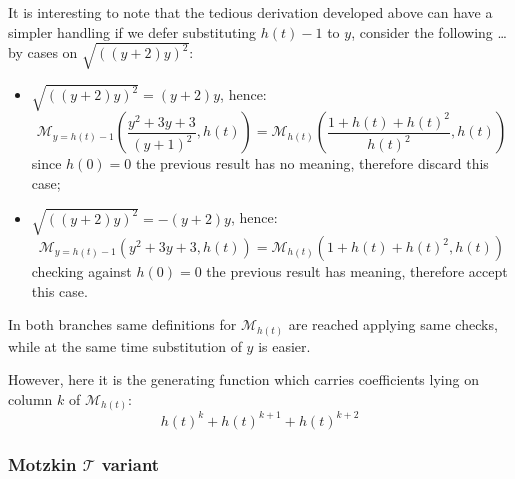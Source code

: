\documentclass[11pt,a4paper]{article} %
\begin{document}
    It is interesting to note that the tedious derivation developed above can have
    a simpler handling if we defer substituting $h(t)-1$ to $y$, consider the following \ldots
    by cases on $\sqrt{\left(\left(y + 2\right) y\right)^{2}}$:
    \begin{itemize}
        \item $\sqrt{\left(\left(y + 2\right) y\right)^{2}}=\left(y + 2\right) y$, hence:
            \begin{displaymath} 
                \mathcal{M}_{y=h(t)-1}\left(\frac{y^{2} + 3y + 3}{{\left(y + 1\right)}^{2}} , h(t) \right) = 
                    \mathcal{M}_{h(t)}\left( \frac{1+h(t)+h(t)^2}{h(t)^2}, h(t) \right) 
            \end{displaymath} 
            since $h(0)=0$ the previous result has no meaning, therefore discard this case;
        \item $\sqrt{\left(\left(y + 2\right) y\right)^{2}}=-\left(y + 2\right) y$, hence:
            \begin{displaymath} 
                \mathcal{M}_{y=h(t)-1}\left(y^{2} + 3y + 3 , h(t) \right) = 
                    \mathcal{M}_{h(t)}\left( 1+h(t)+h(t)^2, h(t) \right) 
            \end{displaymath} 
            checking against $h(0)=0$ the previous result has meaning, therefore accept this case.
    \end{itemize}

    In both branches same definitions for $\mathcal{M}_{h(t)}$ are reached applying
    same checks, while at the same time substitution of $y$ is easier. 
    
    However, here it is the generating function which carries coefficients 
    lying on column $k$ of $\mathcal{M}_{h(t)}$:
    \begin{displaymath} 
        h(t)^{k}+h(t)^{k+1}+h(t)^{k+2}
    \end{displaymath} 


    \subsubsection{Motzkin $\mathcal{T}$ variant}
\end{document}
